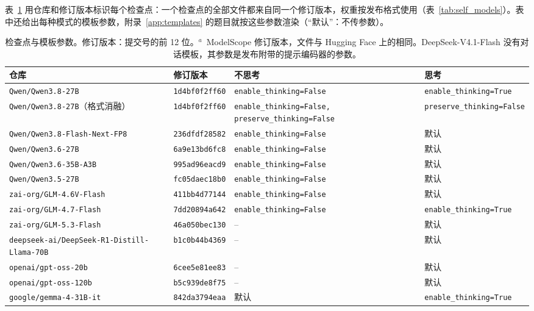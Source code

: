 表~\ref{tab:self_config} 用仓库和修订版本标识每个检查点：一个检查点的全部文件都来自同一个修订版本，权重按发布格式使用（表~\ref{tab:self_models}）。表中还给出每种模式的模板参数，附录~\ref{app:templates} 的题目就按这些参数渲染（“默认”：不传参数）。

\begin{table}[htbp]
\centering
\caption{检查点与模板参数。修订版本：提交号的前 12 位。$^{a}$~ModelScope 修订版本，文件与 Hugging Face 上的相同。DeepSeek-V4.1-Flash 没有对话模板，其参数是发布附带的提示编码器的参数。}
\label{tab:self_config}
\scriptsize
\setlength{\tabcolsep}{2.5pt}
\begin{tabular}{llp{3.2cm}p{3.5cm}}
\toprule
仓库 & 修订版本 & 不思考 & 思考 \\
\midrule
\texttt{Qwen/Qwen3.8-27B} & \texttt{1d4bf0f2ff60} & \texttt{enable\_thinking=False} & \texttt{enable\_thinking=True} \\
\texttt{Qwen/Qwen3.8-27B}（格式消融） & \texttt{1d4bf0f2ff60} & \texttt{enable\_thinking=\allowbreak False, preserve\_thinking=\allowbreak False} & \texttt{preserve\_thinking=False} \\
\texttt{Qwen/Qwen3.8-Flash-Next-FP8} & \texttt{236dfdf28582} & \texttt{enable\_thinking=False} & 默认 \\
\texttt{Qwen/Qwen3.6-27B} & \texttt{6a9e13bd6fc8} & \texttt{enable\_thinking=False} & 默认 \\
\texttt{Qwen/Qwen3.6-35B-A3B} & \texttt{995ad96eacd9} & \texttt{enable\_thinking=False} & 默认 \\
\texttt{Qwen/Qwen3.5-27B} & \texttt{fc05daec18b0} & \texttt{enable\_thinking=False} & 默认 \\
\texttt{zai-org/GLM-4.6V-Flash} & \texttt{411bb4d77144} & \texttt{enable\_thinking=False} & 默认 \\
\texttt{zai-org/GLM-4.7-Flash} & \texttt{7dd20894a642} & \texttt{enable\_thinking=False} & \texttt{enable\_thinking=True} \\
\texttt{zai-org/GLM-5.3-Flash} & \texttt{46a050bec130} & -- & 默认 \\
\texttt{deepseek-ai/DeepSeek-R1-Distill-Llama-70B} & \texttt{b1c0b44b4369} & -- & 默认 \\
\texttt{openai/gpt-oss-20b} & \texttt{6cee5e81ee83} & -- & 默认 \\
\texttt{openai/gpt-oss-120b} & \texttt{b5c939de8f75} & -- & 默认 \\
\texttt{google/gemma-4-31B-it} & \texttt{842da3794eaa} & 默认 & \texttt{enable\_thinking=True} \\

\end{tabular}
\end{table}
